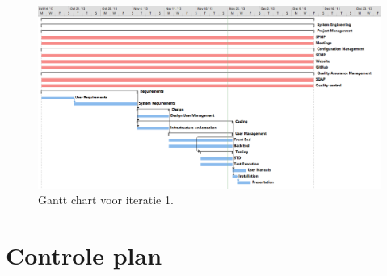\begin{landscape}
	\begin{figure} [H]
		\centering
		\includegraphics[width = 1.35\textwidth]{ManagerialProcess/GanttChartIT1.png}	
		\caption{Gantt chart voor iteratie 1.}
		\label{fig:GantChartIT1}
	\end{figure}
\end{landscape}



\section{Controle plan}

